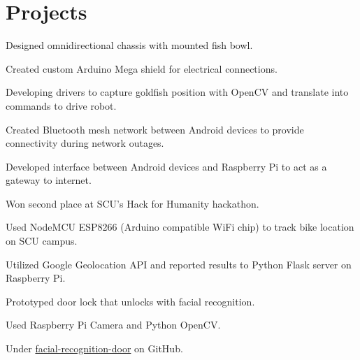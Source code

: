 \documentclass[]{deedy-resume-openfont}
\begin{document}
\begin{minipage}[t]{0.66\textwidth}

\section{Projects}
\begin{tightemize}
\item Designed omnidirectional chassis with mounted fish bowl. 
\item Created custom Arduino Mega shield for electrical connections.
\item Developing drivers to capture goldfish position with OpenCV and translate into commands to drive robot.
\end{tightemize}
\sectionsep

\begin{tightemize}
\item Created Bluetooth mesh network between Android devices to provide connectivity during network outages.
\item Developed interface between Android devices and Raspberry Pi to act as a gateway to internet.
\item Won second place at SCU's Hack for Humanity hackathon.
\end{tightemize}
\sectionsep


\begin{tightemize}
\item Used NodeMCU ESP8266 (Arduino compatible WiFi chip) to track bike location on SCU campus.
\item Utilized Google Geolocation API and reported results to Python Flask server on Raspberry Pi.
\end{tightemize}
\sectionsep

\begin{tightemize}
\item Prototyped door lock that unlocks with facial recognition. 
\item Used Raspberry Pi Camera and Python OpenCV.
\item Under {\href{https://github.com/zachbellay/facial-recognition-door}{facial-recognition-door}} on GitHub.
\end{tightemize}
\sectionsep




\end{minipage} 
\end{document}
